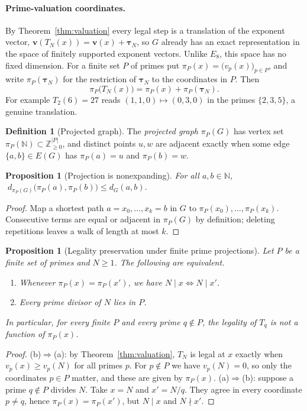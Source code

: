 \documentclass[11pt,a4paper]{article}
\newtheorem{proposition}[theorem]{Proposition}
\theoremstyle{definition}\newtheorem{definition}[theorem]{Definition}
\newcommand{\N}{\mathbb N}
\providecommand{\vv}{}
\renewcommand{\vv}{\mathbf v}
\begin{document}
\paragraph{Prime-valuation coordinates.} By Theorem~\ref{thm:valuation} every legal step is a translation of the exponent vector, $\vv(T_N(x))=\vv(x)+\boldsymbol\tau_N$, so $G$ already has an exact representation in the space of finitely supported exponent vectors. Unlike $E_8$, this space has no fixed dimension. For a finite set $P$ of primes put $\pi_P(x)=\bigl(v_p(x)\bigr)_{p\in P}$, and write $\pi_P(\boldsymbol\tau_N)$ for the restriction of $\boldsymbol\tau_N$ to the coordinates in $P$. Then
\begin{equation}\label{eq:projtrans}
\pi_P\bigl(T_N(x)\bigr)=\pi_P(x)+\pi_P(\boldsymbol\tau_N).
\end{equation}
For example $T_2(6)=27$ reads $(1,1,0)\mapsto(0,3,0)$ in the primes $\{2,3,5\}$, a genuine translation.

\begin{definition}[Projected graph]
The \emph{projected graph} $\pi_P(G)$ has vertex set $\pi_P(\N)\subset\mathbb Z_{\ge0}^{|P|}$, and distinct points $u,w$ are adjacent exactly when some edge $\{a,b\}\in E(G)$ has $\pi_P(a)=u$ and $\pi_P(b)=w$.
\end{definition}

\begin{proposition}[Projection is nonexpanding]\label{prop:nonexpanding}
For all $a,b\in\N$, $\;d_{\pi_P(G)}\bigl(\pi_P(a),\pi_P(b)\bigr)\le d_G(a,b)$.
\end{proposition}
\begin{proof}
Map a shortest path $a=x_0,\dots,x_k=b$ in $G$ to $\pi_P(x_0),\dots,\pi_P(x_k)$. Consecutive terms are equal or adjacent in $\pi_P(G)$ by definition; deleting repetitions leaves a walk of length at most $k$.
\end{proof}

\begin{proposition}[Legality preservation under finite prime projections]\label{prop:legality}
Let $P$ be a finite set of primes and $N\ge1$. The following are equivalent.
\begin{enumerate}[label=(\alph*)]
\item Whenever $\pi_P(x)=\pi_P(x')$, we have $N\mid x\iff N\mid x'$.
\item Every prime divisor of $N$ lies in $P$.
\end{enumerate}
In particular, for every finite $P$ and every prime $q\notin P$, the legality of $T_q$ is not a function of $\pi_P(x)$.
\end{proposition}
\begin{proof}
(b)$\Rightarrow$(a): by Theorem~\ref{thm:valuation}, $T_N$ is legal at $x$ exactly when $v_p(x)\ge v_p(N)$ for all primes $p$. For $p\notin P$ we have $v_p(N)=0$, so only the coordinates $p\in P$ matter, and these are given by $\pi_P(x)$.
(a)$\Rightarrow$(b): suppose a prime $q\notin P$ divides $N$. Take $x=N$ and $x'=N/q$. They agree in every coordinate $p\ne q$, hence $\pi_P(x)=\pi_P(x')$, but $N\mid x$ and $N\nmid x'$.
\end{proof}
\end{document}
